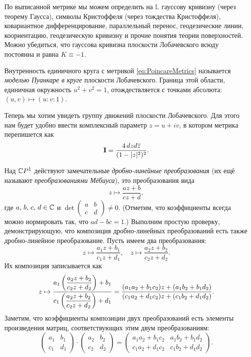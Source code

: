 По выписанной метрике мы можем определить на $\mathbb{L}$ гауссову кривизну (через теорему Гаусса), символы Кристоффеля (через тождества Кристоффеля), ковариантное дифференцирование, параллельный перенос, геодезические линии, коориентацию, геодезическую кривизну и прочие понятия теории поверхностей. Можно убедиться, что гауссова кривизна плоскости Лобачевского всюду постоянна и равна $K \equiv -1$.

Внутренность единичного круга с метрикой \eqref{eq:PoincareMetrics} называется \textit{моделью Пуанкаре в круге} плоскости Лобачевского. Граница этой области, единичная окружность $u^2 + v^2 = 1$, отождествляется с точками абсолюта: $(u, v) \mapsto (u : v : 1)$.

Теперь мы хотим увидеть группу движений плоскости Лобачевского. Для этого нам будет удобно ввести комплексный параметр $z = u + iv$, в котором метрика перепишется как
\begin{equation} \label{eq:zMetrics}
	\boldsymbol{\operatorname{I}} = \frac{4\,dzd\overline{z}}{(1 - |z|^2)^2}.
\end{equation}

Над $\mathbb{C} P^1$ действуют замечательные \textit{дробно-линейные преобразования} (их ещё называют \textit{преобразованиями Мёбиуса}), это преобразования вида
\[
	z \mapsto \frac{az + b}{cz + d},
\]
где $a,\,b,\,c,\,d \in \mathbb{C}$ и
$\det\begin{pmatrix}
	a & b\\
	c & d
\end{pmatrix} \ne 0$. (Отметим, что коэффициенты всегда можно нормировать так, что $ad - bc = 1$.) Выполним простую проверку, демонстрирующую, что композиция дробно-линейных преобразований есть также дробно-линейное преобразование. Пусть имеем два преобразования:
\[
	z \mapsto \frac{a_1z + b_1}{c_1z + d_1},\quad
	z \mapsto \frac{a_2z + b_2}{c_2z + d_2}.
\]
Их композиция записывается как
\[
	z \mapsto \frac{a_1\left(\dfrac{a_2z + b_2}{c_2z + d_2}\right) + b_1}{c_1\left(\dfrac{a_2z + b_2}{c_2z + d_2}\right) + d_1} = \frac{(a_1a_2 + b_1c_2)z + (a_1b_2 + b_1d_2)}{(c_1a_2 + d_1c_2)z + (c_1b_2 + d_1d_2)}.
\]
Заметим, что коэффициенты композиции двух преобразований есть элементы произведения матриц, соответствующих этим двум преобразованиям:
\[
	\begin{pmatrix}
		a_1 & b_1\\
		c_1 & d_1
	\end{pmatrix} \cdot
	\begin{pmatrix}
		a_2 & b_2\\
		c_2 & d_2
	\end{pmatrix} =
	\begin{pmatrix}
		a_1a_2 + b_1c_2 & a_1b_2 + b_1d_2\\
		c_1a_2 + d_1c_2 & c_1b_2 + d_1d_2
	\end{pmatrix}.
\]

